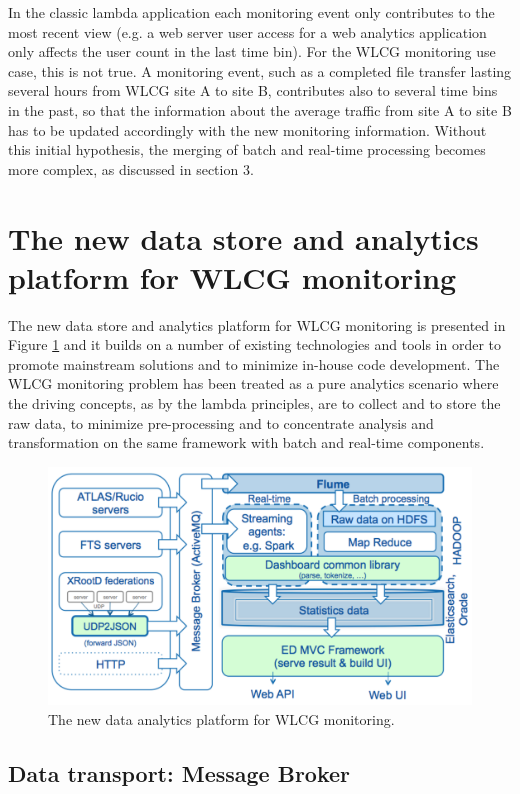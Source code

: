 In the classic lambda application each monitoring event only contributes to the
most recent view (e.g. a web server user access for a web analytics application
only affects the user count in the last time bin). For the WLCG monitoring use
case, this is not true. A monitoring event, such as a completed file transfer
lasting several hours from WLCG site A to site B, contributes also to several
time bins in the past, so that the information about the average traffic from
site A to site B has to be updated accordingly with the new monitoring
information. Without this initial hypothesis, the merging of batch and
real-time processing becomes more complex, as discussed in section 3.

\section{The new data store and analytics platform for WLCG monitoring}

The new data store and analytics platform for WLCG monitoring is presented in
Figure \ref{fig:narch} and it builds on a number of existing technologies and
tools in order to promote mainstream solutions and to minimize in-house code
development. The WLCG monitoring problem has been treated as a pure analytics
scenario where the driving concepts, as by the lambda principles, are to
collect and to store the raw data, to minimize pre-processing and to concentrate
analysis and transformation on the same framework with batch and real-time
components. 

\begin{figure}
  \centering
  \includegraphics[width=120mm]{./Figures/new_arch.pdf}
  \caption{\small The new data analytics platform for WLCG monitoring.}\label{fig:narch}
\end{figure}

\subsection{Data transport: Message Broker}

